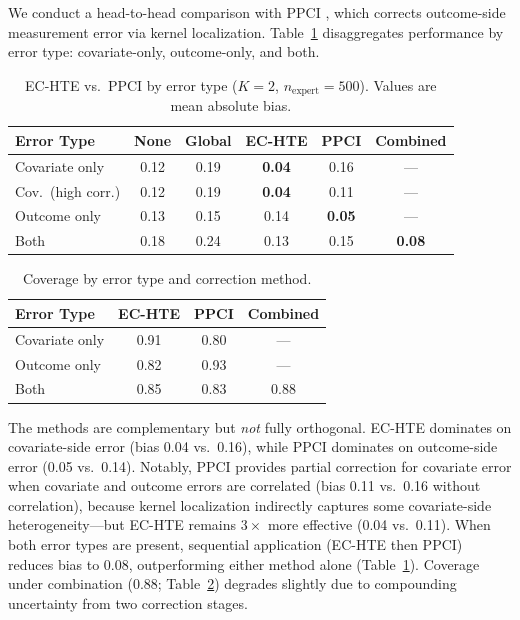 \documentclass[11pt,a4paper]{article}
\begin{document}
We conduct a head-to-head comparison with PPCI \citep{sui2026prediction}, which corrects outcome-side measurement error via kernel localization.
Table~\ref{tab:ppci} disaggregates performance by error type: covariate-only, outcome-only, and both.

\begin{table}[t]
\centering
\small
\caption{EC-HTE vs.\ PPCI by error type ($K=2$, $n_{\text{expert}}=500$). Values are mean absolute bias.}
\label{tab:ppci}
\begin{tabular}{lccccc}
\toprule
Error Type & None & Global & EC-HTE & PPCI & Combined \\
\midrule
Covariate only & 0.12 & 0.19 & \textbf{0.04} & 0.16 & --- \\
Cov.\ (high corr.) & 0.12 & 0.19 & \textbf{0.04} & 0.11 & --- \\
Outcome only & 0.13 & 0.15 & 0.14 & \textbf{0.05} & --- \\
Both & 0.18 & 0.24 & 0.13 & 0.15 & \textbf{0.08} \\
\bottomrule
\end{tabular}
\end{table}

\begin{table}[t]
\centering
\small
\caption{Coverage by error type and correction method.}
\label{tab:ppci_coverage}
\begin{tabular}{lccc}
\toprule
Error Type & EC-HTE & PPCI & Combined \\
\midrule
Covariate only & 0.91 & 0.80 & --- \\
Outcome only & 0.82 & 0.93 & --- \\
Both & 0.85 & 0.83 & 0.88 \\
\bottomrule
\end{tabular}
\end{table}

The methods are complementary but \emph{not} fully orthogonal.
EC-HTE dominates on covariate-side error (bias 0.04 vs.\ 0.16), while PPCI dominates on outcome-side error (0.05 vs.\ 0.14).
Notably, PPCI provides partial correction for covariate error when covariate and outcome errors are correlated (bias 0.11 vs.\ 0.16 without correlation), because kernel localization indirectly captures some covariate-side heterogeneity---but EC-HTE remains $3\times$ more effective (0.04 vs.\ 0.11).
When both error types are present, sequential application (EC-HTE then PPCI) reduces bias to 0.08, outperforming either method alone (Table~\ref{tab:ppci}).
Coverage under combination (0.88; Table~\ref{tab:ppci_coverage}) degrades slightly due to compounding uncertainty from two correction stages.
\end{document}
